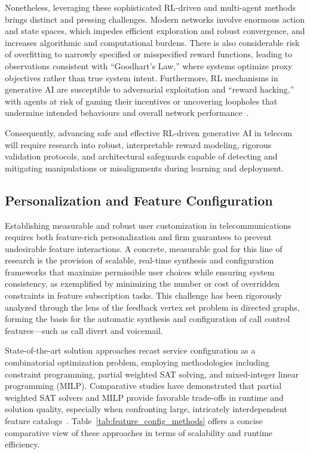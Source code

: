 \documentclass[sigconf]{acmart}
\begin{document}
Nonetheless, leveraging these sophisticated RL-driven and multi-agent methods brings distinct and pressing challenges. Modern networks involve enormous action and state spaces, which impedes efficient exploration and robust convergence, and increases algorithmic and computational burdens. There is also considerable risk of overfitting to narrowly specified or misspecified reward functions, leading to observations consistent with ``Goodhart’s Law,'' where systems optimize proxy objectives rather than true system intent. Furthermore, RL mechanisms in generative AI are susceptible to adversarial exploitation and ``reward hacking,'' with agents at risk of gaming their incentives or uncovering loopholes that undermine intended behaviours and overall network performance~\cite{ref1}.

Consequently, advancing safe and effective RL-driven generative AI in telecom will require research into robust, interpretable reward modeling, rigorous validation protocols, and architectural safeguards capable of detecting and mitigating manipulations or misalignments during learning and deployment.

\subsection{Personalization and Feature Configuration}

Establishing measurable and robust user customization in telecommunications requires both feature-rich personalization and firm guarantees to prevent undesirable feature interactions. A concrete, measurable goal for this line of research is the provision of scalable, real-time synthesis and configuration frameworks that maximize permissible user choices while ensuring system consistency, as exemplified by minimizing the number or cost of overridden constraints in feature subscription tasks. This challenge has been rigorously analyzed through the lens of the feedback vertex set problem in directed graphs, forming the basis for the automatic synthesis and configuration of call control features—such as call divert and voicemail.

State-of-the-art solution approaches recast service configuration as a combinatorial optimization problem, employing methodologies including constraint programming, partial weighted SAT solving, and mixed-integer linear programming (MILP). Comparative studies have demonstrated that partial weighted SAT solvers and MILP provide favorable trade-offs in runtime and solution quality, especially when confronting large, intricately interdependent feature catalogs~\cite{ref31}. Table~\ref{tab:feature_config_methods} offers a concise comparative view of these approaches in terms of scalability and runtime efficiency.
\end{document}
